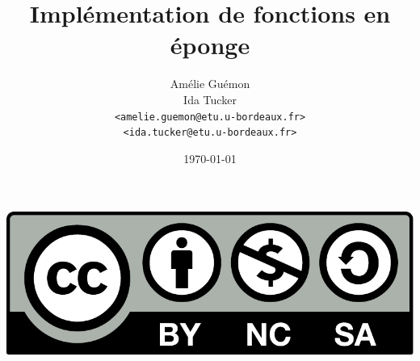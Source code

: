 %
%

\usepackage[french]{babel}
\usepackage{tikz}
\usetikzlibrary{shapes}
\usetikzlibrary{positioning}
\usepackage{color}
\usepackage{amsmath, amsthm, amscd, amssymb, amsfonts, amsxtra}
\usepackage{stmaryrd}
\usepackage{graphicx, wrapfig, lipsum}

\def\tikzoverlay{
   \tikz[remember picture, overlay]\node[every overlay node]
}

\newcommand{\highlight}[1]{\textcolor{structure.fg}{\bfseries #1}}

\title{Implémentation de fonctions en éponge}

\author[Amélie Guémon \& Ida Tucker]{Amélie Guémon\\Ida Tucker\\[.25em]
\texttt{\scriptsize <amelie.guemon@etu.u-bordeaux.fr>}\\[-.25em]
\texttt{\scriptsize <ida.tucker@etu.u-bordeaux.fr>}\\}


\date{\today}



\begin{frame}
  \vspace{3.5em}
  \titlepage

  \begin{center}
    \includegraphics[scale=.2]{cc-by-nc-sa.pdf}
  \end{center}
\end{frame}

